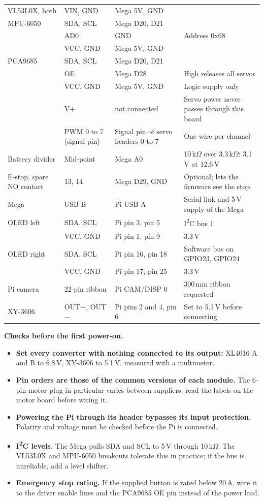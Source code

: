 {\begin{longtable}{@{}P{37mm}P{27mm}P{38mm}P{50mm}@{}}
VL53L0X, both & VIN, GND & Mega 5V, GND & \\
MPU-6050 & SDA, SCL & Mega D20, D21 & \\
 & AD0 & GND & Address 0x68\\
 & VCC, GND & Mega 5V, GND & \\
PCA9685 & SDA, SCL & Mega D20, D21 & \\
 & OE & Mega D28 & High releases all servos\\
 & VCC, GND & Mega 5V, GND & Logic supply only\\
 & V+ & not connected & Servo power never passes through this board\\
 & PWM 0 to 7 (signal pin) & Signal pin of servo headers 0 to 7 & One wire per channel\\
Battery divider & Mid-point & Mega A0 & 10\,k$\Omega$ over 3.3\,k$\Omega$: 3.1\,V at 12.6\,V\\
E-stop, spare NO contact & 13, 14 & Mega D29, GND & Optional; lets the firmware see the stop\\
Mega & USB-B & Pi USB-A & Serial link and 5\,V supply of the Mega\\
OLED left & SDA, SCL & Pi pin 3, pin 5 & I\textsuperscript{2}C bus 1\\
 & VCC, GND & Pi pin 1, pin 9 & 3.3\,V\\
OLED right & SDA, SCL & Pi pin 16, pin 18 & Software bus on GPIO23, GPIO24\\
 & VCC, GND & Pi pin 17, pin 25 & 3.3\,V\\
Pi camera & 22-pin ribbon & Pi CAM/DISP 0 & 300\,mm ribbon requested\\
XY-3606 & OUT+, OUT$-$ & Pi pins 2 and 4, pin 6 & Set to 5.1\,V before connecting\\
\bottomrule
\end{longtable}}

\textbf{Checks before the first power-on.}
\begin{itemize}
\item \textbf{Set every converter with nothing connected to its output:} XL4016 A and B to 6.8\,V, XY-3606 to 5.1\,V, measured with a multimeter.
\item \textbf{Pin orders are those of the common versions of each module.} The 6-pin motor plug in particular varies between suppliers: read the labels on the motor board before wiring it.
\item \textbf{Powering the Pi through its header bypasses its input protection.} Polarity and voltage must be checked before the Pi is connected.
\item \textbf{I\textsuperscript{2}C levels.} The Mega pulls SDA and SCL to 5\,V through 10\,k$\Omega$. The VL53L0X and MPU-6050 breakouts tolerate this in practice; if the bus is unreliable, add a level shifter.
\item \textbf{Emergency stop rating.} If the supplied button is rated below 20\,A, wire it to the driver enable lines and the PCA9685 OE pin instead of the power lead.
\end{itemize}
